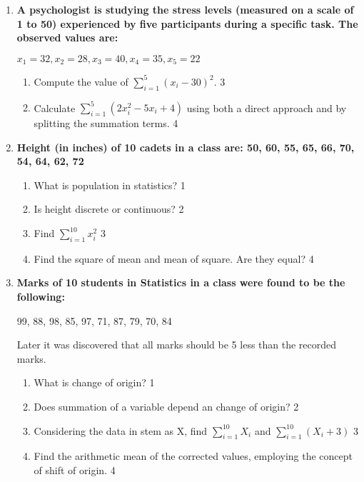 \documentclass[a4paper,oneside]{book}
\begin{document}
\begin{enumerate}
  \item
\textbf{A psychologist is studying the stress levels (measured on a scale 
of 1 to 50) experienced by five participants during a specific task. 
The observed values are:}
\begin{center}
$x_1 = 32, x_2 = 28, x_3 = 40, x_4 = 35, x_5 = 22$
\end{center}
\begin{enumerate}
    \item
    Compute the value of $\displaystyle \sum_{i=1}^5 (x_i - 30)^2$. \hfill 3
    \item
    Calculate $\displaystyle \sum_{i=1}^5 (2x_i^2 - 5x_i + 4)$ using both a direct approach and by splitting the summation terms. \hfill 4
\end{enumerate}


 \item
	  \textbf{Height (in inches) of 10 cadets in a class are: 50, 60, 55, 65, 66, 70, 54, 64, 62, 72} 
	 
  \begin{enumerate}
    \item
	What is population in statistics? \hfill 1
    \item
	Is height discrete or continuous? \hfill 2
    \item  
	Find $\displaystyle \sum_{i=1}^{10} x_i^2$ \hfill 3
    \item
	Find the square of mean and mean of square. Are they equal? \hfill 4
  \end{enumerate}
  
   \item
	  \textbf{Marks of 10 students in Statistics in a class were found to be the following:} 
	 
	 \begin{center} 
	  99, 88, 98, 85, 97, 71, 87, 79, 70, 84
	  
	  \end{center}
	  
	  Later it was discovered that all marks should be 5 less than the recorded marks. 
  
  \begin{enumerate}
    \item
	What is change of origin? \hfill 1
    \item
	Does summation of a variable depend an change of origin?  \hfill 2
    \item  
	Considering the data in stem as X, find $\displaystyle \sum_{i=1}^{10} X_i$ and $\displaystyle \sum_{i=1}^{10} (X_i+3)$ \hfill 3
    \item
	Find the arithmetic mean of the corrected values, employing the concept of shift of origin. \hfill 4
  \end{enumerate}


\end{enumerate}
\end{document}
